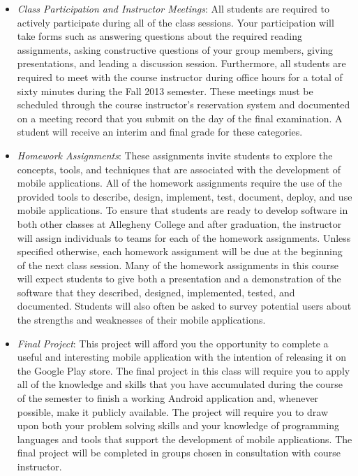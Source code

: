 \begin{itemize}

	\item {\em Class Participation and Instructor Meetings}: All students are required to actively participate during
		all of the class sessions. Your participation will take forms such as answering questions about the required
		reading assignments, asking constructive questions of your group members, giving presentations, and leading a
		discussion session. Furthermore, all students are required to meet with the course instructor during office
		hours for a total of sixty minutes during the Fall 2013 semester.  These meetings must be scheduled through the
		course instructor's reservation system and documented on a meeting record that you submit on the day of the final
		examination. A student will receive an interim and final grade for these categories.

	\item {\em Homework Assignments}: These assignments invite students to explore the concepts, tools,
		and techniques that are associated with the development of mobile applications.  All of the
		homework assignments require the use of the provided tools to describe, design, implement, test, document,
		deploy, and use mobile applications.  To ensure that students are ready to develop software in both other classes at
		Allegheny College and after graduation, the instructor will assign individuals to teams for each of the
		homework assignments.  Unless specified otherwise, each homework assignment will be due at the beginning of
		the next class session.  Many of the homework assignments in this course will expect students to
		give both a presentation and a demonstration of the software that they described, designed, implemented, tested,
		and documented. Students will also often be asked to survey potential users about the strengths and weaknesses
		of their mobile applications.
	
	\item {\em Final Project}: This project will afford you the opportunity to complete a useful and interesting mobile
		application with the intention of releasing it on the Google Play store.	The final project in this class will
		require you to apply all of the knowledge and skills that you have accumulated during the course of the semester
		to finish a working Android application and, whenever possible, make it publicly available.  The project will
		require you to draw upon both your problem solving skills and your knowledge of programming languages and tools
		that support the development of mobile applications. The final project will be completed in groups chosen in
		consultation with course instructor.
		
\end{itemize}

